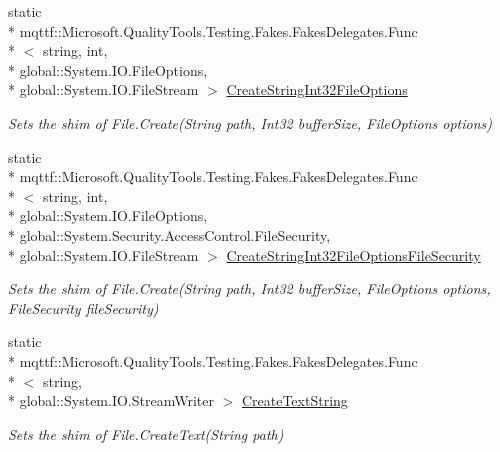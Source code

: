 \begin{DoxyCompactItemize}
static \\*
mqttf\-::\-Microsoft.\-Quality\-Tools.\-Testing.\-Fakes.\-Fakes\-Delegates.\-Func\\*
$<$ string, int, \\*
global\-::\-System.\-I\-O.\-File\-Options, \\*
global\-::\-System.\-I\-O.\-File\-Stream $>$ \hyperlink{class_system_1_1_i_o_1_1_fakes_1_1_shim_file_a482bdd7d287e0105a3e37cd84461688d}{Create\-String\-Int32\-File\-Options}
\begin{DoxyCompactList}\small\item\em Sets the shim of File.\-Create(\-String path, Int32 buffer\-Size, File\-Options options)\end{DoxyCompactList}\item 
static \\*
mqttf\-::\-Microsoft.\-Quality\-Tools.\-Testing.\-Fakes.\-Fakes\-Delegates.\-Func\\*
$<$ string, int, \\*
global\-::\-System.\-I\-O.\-File\-Options, \\*
global\-::\-System.\-Security.\-Access\-Control.\-File\-Security, \\*
global\-::\-System.\-I\-O.\-File\-Stream $>$ \hyperlink{class_system_1_1_i_o_1_1_fakes_1_1_shim_file_ad47ccb42756f7fd8cccdb04cec034f30}{Create\-String\-Int32\-File\-Options\-File\-Security}
\begin{DoxyCompactList}\small\item\em Sets the shim of File.\-Create(\-String path, Int32 buffer\-Size, File\-Options options, File\-Security file\-Security)\end{DoxyCompactList}\item 
static \\*
mqttf\-::\-Microsoft.\-Quality\-Tools.\-Testing.\-Fakes.\-Fakes\-Delegates.\-Func\\*
$<$ string, \\*
global\-::\-System.\-I\-O.\-Stream\-Writer $>$ \hyperlink{class_system_1_1_i_o_1_1_fakes_1_1_shim_file_a506223a5d78afc4b4cd8ecdaedf55076}{Create\-Text\-String}
\begin{DoxyCompactList}\small\item\em Sets the shim of File.\-Create\-Text(\-String path)\end{DoxyCompactList}\item 

\end{DoxyCompactItemize}
